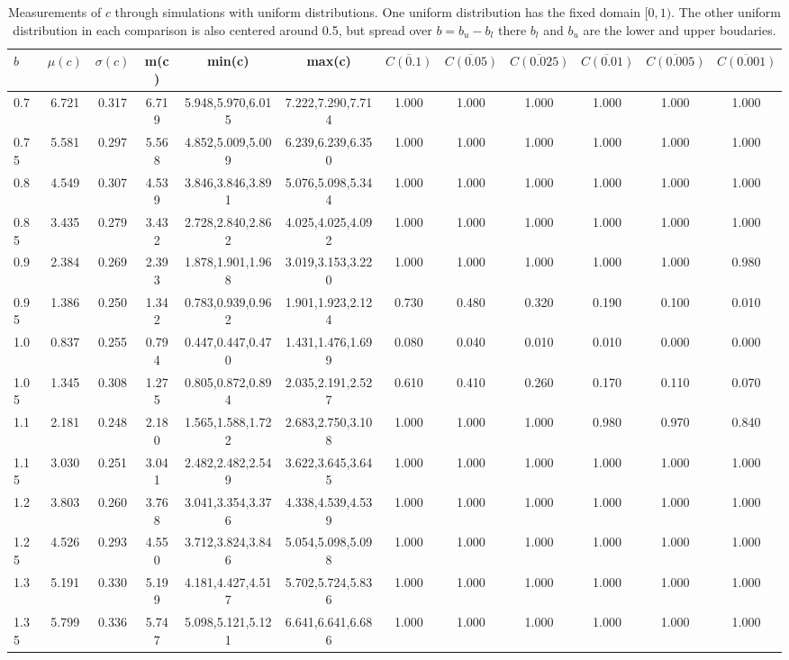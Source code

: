 \begin{table*}[h!]
\begin{center}
\begin{tabular}{| l | c | c | c | c | c | c | c | c | c | c | c |}\hline
$b$ & $\mu(c)$ & $\sigma(c)$ & m(c) & min(c) & max(c) & $\overline{C(0.1)}$ & $\overline{C(0.05)}$ & $\overline{C(0.025)}$ & $\overline{C(0.01)}$ & $\overline{C(0.005)}$ & $\overline{C(0.001)}$ \\\hline
0.7 & 6.721 & 0.317 & 6.719 & 5.948,5.970,6.015 & 7.222,7.290,7.714  & 1.000  & 1.000  & 1.000  & 1.000  & 1.000  & 1.000 \\\hline
0.75 & 5.581 & 0.297 & 5.568 & 4.852,5.009,5.009 & 6.239,6.239,6.350  & 1.000  & 1.000  & 1.000  & 1.000  & 1.000  & 1.000 \\\hline
0.8 & 4.549 & 0.307 & 4.539 & 3.846,3.846,3.891 & 5.076,5.098,5.344  & 1.000  & 1.000  & 1.000  & 1.000  & 1.000  & 1.000 \\\hline
0.85 & 3.435 & 0.279 & 3.432 & 2.728,2.840,2.862 & 4.025,4.025,4.092  & 1.000  & 1.000  & 1.000  & 1.000  & 1.000  & 1.000 \\\hline
0.9 & 2.384 & 0.269 & 2.393 & 1.878,1.901,1.968 & 3.019,3.153,3.220  & 1.000  & 1.000  & 1.000  & 1.000  & 1.000  & 0.980 \\\hline
0.95 & 1.386 & 0.250 & 1.342 & 0.783,0.939,0.962 & 1.901,1.923,2.124  & 0.730  & 0.480  & 0.320  & 0.190  & 0.100  & 0.010 \\\hline
1.0 & 0.837 & 0.255 & 0.794 & 0.447,0.447,0.470 & 1.431,1.476,1.699  & 0.080  & 0.040  & 0.010  & 0.010  & 0.000  & 0.000 \\\hline
1.05 & 1.345 & 0.308 & 1.275 & 0.805,0.872,0.894 & 2.035,2.191,2.527  & 0.610  & 0.410  & 0.260  & 0.170  & 0.110  & 0.070 \\\hline
1.1 & 2.181 & 0.248 & 2.180 & 1.565,1.588,1.722 & 2.683,2.750,3.108  & 1.000  & 1.000  & 1.000  & 0.980  & 0.970  & 0.840 \\\hline
1.15 & 3.030 & 0.251 & 3.041 & 2.482,2.482,2.549 & 3.622,3.645,3.645  & 1.000  & 1.000  & 1.000  & 1.000  & 1.000  & 1.000 \\\hline
1.2 & 3.803 & 0.260 & 3.768 & 3.041,3.354,3.376 & 4.338,4.539,4.539  & 1.000  & 1.000  & 1.000  & 1.000  & 1.000  & 1.000 \\\hline
1.25 & 4.526 & 0.293 & 4.550 & 3.712,3.824,3.846 & 5.054,5.098,5.098  & 1.000  & 1.000  & 1.000  & 1.000  & 1.000  & 1.000 \\\hline
1.3 & 5.191 & 0.330 & 5.199 & 4.181,4.427,4.517 & 5.702,5.724,5.836  & 1.000  & 1.000  & 1.000  & 1.000  & 1.000  & 1.000 \\\hline
1.35 & 5.799 & 0.336 & 5.747 & 5.098,5.121,5.121 & 6.641,6.641,6.686  & 1.000  & 1.000  & 1.000  & 1.000  & 1.000  & 1.000 \\\hline
\end{tabular}
\caption{Measurements of $c$ through simulations
        with uniform distributions.
        One uniform distribution has the fixed domain $[0,1)$.
        The other uniform distribution in each comparison
        is also centered around 0.5,
        but spread over $b=b_u-b_l$ there $b_l$ and $b_u$ are the lower and upper boudaries.}
\end{center}
\end{table*}